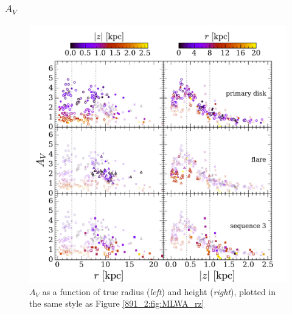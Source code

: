 

\subsubsection{{\Large $A_V$}}

\begin{figure}
  \centering
  \includegraphics[width=\textwidth]{891_2/figs/AV_rz_all.pdf}
  \caption[$A_V$ vs ($r,|z|$)]{\fixspacing\label{891_2:fig:AV_rz}$A_V$
    as a function of true radius (\emph{left}) and height
    (\emph{right}), plotted in the same style as Figure
    \ref{891_2:fig:MLWA_rz}}
\end{figure}

